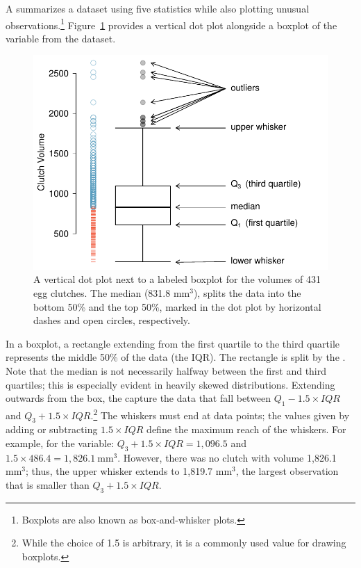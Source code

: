 \newpage

A  summarizes a dataset using five statistics while also plotting unusual observations.\footnote{Boxplots are also known as box-and-whisker plots.} Figure~\ref{frogBoxPlot} provides a vertical dot plot alongside a boxplot of the  variable from the  dataset. 

\begin{figure}[th]
	\centering
	\includegraphics[width=0.86\mycaptionwidth]{ch_intro_to_data_oi_biostat/figures/frogBoxPlot/frogBoxPlot}
	\caption{A vertical dot plot next to a labeled boxplot for the volumes of 431 egg clutches. The median (831.8 $\textrm {mm}^{3}$), splits the data into the bottom 50\% and the top 50\%, marked in the dot plot by horizontal dashes and open circles, respectively.}
	\label{frogBoxPlot}
\end{figure}

In a boxplot, a rectangle extending from the first quartile to the third quartile represents the middle 50\% of the data (the IQR). The rectangle is split by the . Note that the median is not necessarily halfway between the first and third quartiles; this is especially evident in heavily skewed distributions. Extending outwards from the box, the  capture the data that fall between $Q_1 - 1.5\times IQR$ and $Q_3 + 1.5\times IQR$.\footnote{While the choice of 1.5 is arbitrary, it is a commonly used value for drawing boxplots.} The whiskers must end at data points; the values given by adding or subtracting $1.5\times IQR$ define the maximum reach of the whiskers. For example, for the  variable: $Q_3 + 1.5\times IQR = 1,096.5$ and $1.5\times 486.4 = 1,826.1\ \textrm {mm}^{3}$. However, there was no clutch with volume 1,826.1\ $\textrm {mm}^{3}$; thus, the upper whisker extends to 1,819.7 $\textrm {mm}^{3}$, the largest observation that is smaller than $Q_3 + 1.5\times IQR$.

